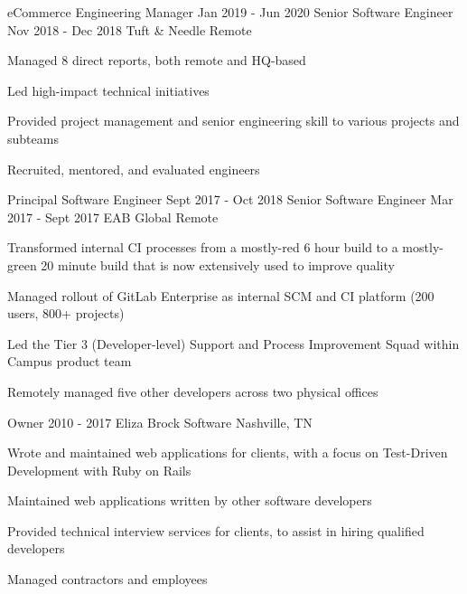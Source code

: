 \begin{cventries}
  \doublecventry
  {eCommerce Engineering Manager}
  {Jan 2019 - Jun 2020}
  {Senior Software Engineer}
  {Nov 2018 - Dec 2018}
  {Tuft \& Needle}
  {Remote}
  {
    \begin{cvitems}
      \item Managed 8 direct reports, both remote and HQ-based
      \item Led high-impact technical initiatives
      \item Provided project management and senior engineering skill to various projects and subteams
      \item Recruited, mentored, and evaluated engineers
    \end{cvitems}
    \cvtags{
      \tagRuby
      \tagRails
      \tagPostgreSQL
      \tagAccessibility
      \tagCI
      \tagTDD
      \tagPeopleManagement
      \tagProjectManagement
    }
  }

  \doublecventry
  {Principal Software Engineer}
  {Sept 2017 - Oct 2018}
  {Senior Software Engineer}
  {Mar 2017 - Sept 2017}
  {EAB Global}
  {Remote}
  {
    \begin{cvitems}
      \item Transformed internal CI processes from a mostly-red 6 hour build to a mostly-green 20 minute build that is now extensively used to improve quality
      \item Managed rollout of GitLab Enterprise as internal SCM and CI platform (200 users, 800+ projects)
      \item Led the Tier 3 (Developer-level) Support and Process Improvement Squad within Campus product team
      \item Remotely managed five other developers across two physical offices
    \end{cvitems}
    \cvtags{
      \tagRuby
      \tagRails
      \tagMySQL
      \tagCI
      \tagTDD
      \tagPeopleManagement
      \tagProjectManagement
    }
  }

  \cventry
  {Owner}
  {2010 - 2017}
  {Eliza Brock Software}
  {Nashville, TN}
  {
    \begin{cvitems}
      \item Wrote and maintained web applications for clients, with a focus on Test-Driven \mbox{Development} with Ruby on Rails
      \item Maintained web applications written by other software developers
      \item Provided technical interview services for clients, to assist in hiring qualified developers
      \item Managed contractors and employees
    \end{cvitems}
    \cvtags{
      \tagRuby
      \tagHAML
      \tagJavaScript
      \tagSASS
      \tagRails
      \tagPostgreSQL
      \tagCI
      \tagTDD
      \tagPairProgramming
      \tagPeopleManagement
      \tagProjectManagement
      \tagBalsamiq
      \tagPerl
      \tagPHP
    }
  }


\end{cventries}
